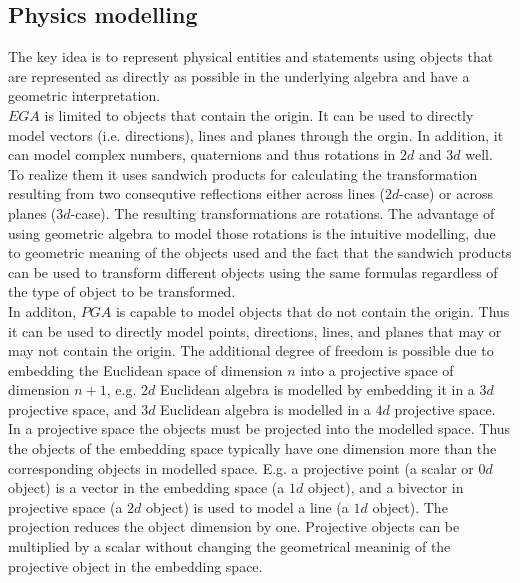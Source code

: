 \subsection{Physics modelling}
\label{physics_modelling}

The key idea is to represent physical entities and statements using objects that are
represented as directly as possible in the underlying algebra and have a geometric
interpretation. \\

$EGA$ is limited to objects that contain the origin. It can be used to directly model
vectors (i.e. directions), lines and planes through the orgin. In addition, it can model
complex numbers, quaternions and thus rotations in $2d$ and $3d$ well. To realize them it
uses sandwich products for calculating the transformation resulting from two consequtive
reflections either across lines ($2d$-case) or across planes ($3d$-case). The resulting
transformations are rotations. The advantage of using geometric algebra to model those
rotations is the intuitive modelling, due to geometric meaning of the objects used and the
fact that the sandwich products can be used to transform different objects using the same
formulas regardless of the type of object to be transformed.\\

In additon, $PGA$ is capable to model objects that do not contain the origin. Thus it can
be used to directly model points, directions, lines, and planes that may or may not
contain the origin. The additional degree of freedom is possible due to embedding the
Euclidean space of dimension $n$ into a projective space of dimension $n+1$, e.g. $2d$
Euclidean algebra is modelled by embedding it in a $3d$ projective space, and $3d$
Euclidean algebra is modelled in a $4d$ projective space. In a projective space the
objects must be projected into the modelled space. Thus the objects of the embedding space
typically have one dimension more than the corresponding objects in modelled space. E.g. a
projective point (a scalar or $0d$ object) is a vector in the embedding space (a $1d$
object), and a bivector in projective space (a $2d$ object) is used to model a line (a
$1d$ object). The projection reduces the object dimension by one. Projective objects can
be multiplied by a scalar without changing the geometrical meaninig of the projective
object in the embedding space. \\

